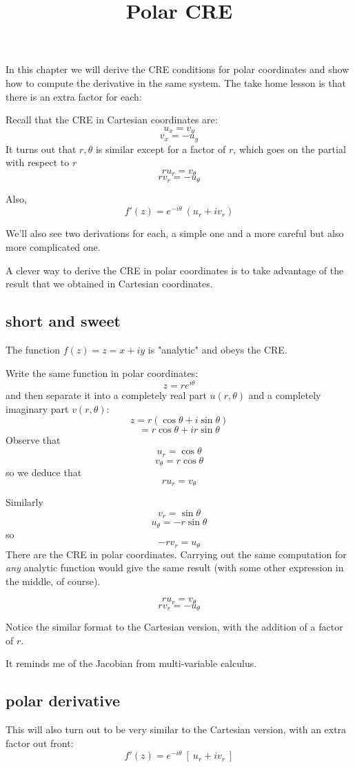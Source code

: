 \documentclass[11pt, oneside]{article}
\title{Polar CRE}
\date{}
\begin{document}
\maketitle
\Large

In this chapter we will derive the CRE conditions for polar coordinates and show how to compute the derivative in the same system.  The take home lesson is that there is an extra factor for each:

Recall that the CRE in Cartesian coordinates are:
\[ u_x = v_y \]
\[ v_x = -u_y \]
It turns out that $r,\theta$ is similar except for a factor of $r$, which goes on the partial with respect to $r$
\[ r u_r = v_{\theta} \]
\[ r v_r = - u_{\theta} \]

Also,
\[ f'(z) = e^{-i \theta} \ (u_r + i v_r) \]

We'll also see two derivations for each, a simple one and a more careful but also more complicated one. 

A clever way to derive the CRE in polar coordinates is to take advantage of the result that we obtained in Cartesian coordinates.

\subsection*{short and sweet}

The function $f(z) = z = x + iy$ is "analytic" and obeys the CRE.  

Write the same function in polar coordinates:
\[ z = re^{i \theta} \]
and then separate it into a completely real part $u(r, \theta)$ and a completely imaginary part $v(r,\theta)$:
\[ z = r(\cos \theta + i \sin \theta) \]
\[ = r \cos \theta + i r \sin \theta \]
Observe that
\[ u_r = \cos \theta \]
\[ v_{\theta} = r \cos \theta \]
so we deduce that
\[ r u_r =  v_{\theta} \]

Similarly
\[ v_r = \sin \theta \]
\[ u_{\theta} = - r \sin \theta \]
so
\[ -r v_r = u_{\theta} \]
There are the CRE in polar coordinates.  Carrying out the same computation for \emph{any} analytic function would give the same result (with some other expression in the middle, of course).

\[ r u_r = v_{\theta} \]
\[ r v_r = - u_{\theta} \]

Notice the similar format to the Cartesian version, with the addition of a factor of $r$.  

It reminds me of the Jacobian from multi-variable calculus.

\subsection*{polar derivative} 
This will also turn out to be very similar to the Cartesian version, with an extra factor out front:
\[ f'(z) = e^{-i \theta} \ [ \ u_r + i v_r \ ] \]
\end{document}
